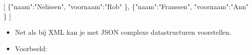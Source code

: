 \documentclass[]{memoir}
\newenvironment{Shaded}{\begin{snugshade}}{\end{snugshade}}
\newcommand{\DataTypeTok}[1]{\textcolor[rgb]{0.13,0.29,0.53}{#1}}
\newcommand{\StringTok}[1]{\textcolor[rgb]{0.31,0.60,0.02}{#1}}
\newcommand{\OtherTok}[1]{\textcolor[rgb]{0.56,0.35,0.01}{#1}}
\newcommand{\FunctionTok}[1]{\textcolor[rgb]{0.00,0.00,0.00}{#1}}
\providecommand{\tightlist}{%
  \setlength{\itemsep}{0pt}\setlength{\parskip}{0pt}}
\begin{document}
\begin{Shaded}
\begin{Highlighting}[]
\OtherTok{[}
  \FunctionTok{\{}\DataTypeTok{"naam"}\FunctionTok{:}\StringTok{"Nelissen"}\FunctionTok{,} 
   \DataTypeTok{"voornaam"}\FunctionTok{:}\StringTok{"Rob"} 
  \FunctionTok{\}}\OtherTok{,} 
  \FunctionTok{\{}\DataTypeTok{"naam"}\FunctionTok{:}\StringTok{"Franssen"}\FunctionTok{,} 
   \DataTypeTok{"voornaam"}\FunctionTok{:}\StringTok{"Ann"}
  \FunctionTok{\}}
\OtherTok{]}
\end{Highlighting}
\end{Shaded}

\begin{itemize}
\tightlist
\item
  Net als bij XML kan je met JSON complexe datastructuren voorstellen.
\item
  Voorbeeld:
\end{itemize}
\end{document}
